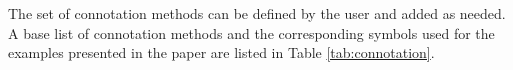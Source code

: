 
The set of connotation methods can be defined by the user and added as needed. A base list of connotation methods and the corresponding symbols used for the examples presented in the paper are listed in Table \ref{tab:connotation}.

